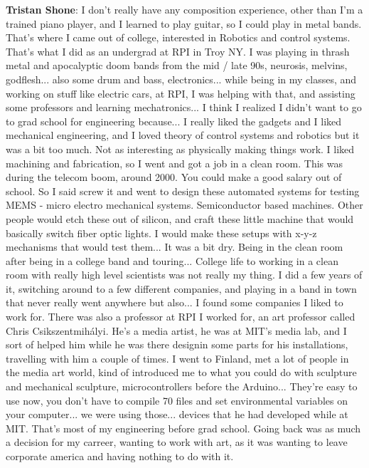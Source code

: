 \textbf{Tristan Shone}: I don't really have any composition experience, other than I'm a trained piano player, and I learned to play guitar, so I could play in metal bands. That's where I came out of college, interested in Robotics and control systems. That's what I did as an undergrad at RPI in Troy NY. I was playing in thrash metal and apocalyptic doom bands from the mid / late 90s, neurosis, melvins, godflesh... also some drum and bass, electronics... while being in my classes, and working on stuff like electric cars, at RPI, I was helping with that, and assisting some professors and learning mechatronics... I think I realized I didn't want to go to grad school for engineering because... I really liked the gadgets and I liked mechanical engineering, and I loved theory of control systems and robotics but it was a bit too much. Not as interesting as physically making things work. I liked machining and fabrication, so I went and got a job in a clean room. This was during the telecom boom, around 2000. You could make a good salary out of school. So I said screw it and went to design these automated systems for testing MEMS - micro electro mechanical systems. Semiconductor based machines. Other people would etch these out of silicon, and craft these little machine that would basically switch fiber optic lights. I would make these setups with x-y-z mechanisms that would test them... It was a bit dry. Being in the clean room after being in a college band and touring... College life to working in a clean room with really high level scientists was not really my thing. I did a few years of it, switching around to a few different companies, and playing in a band in town that never really went anywhere but also... I found some companies I liked to work for. There was also a professor at RPI I worked for, an art professor called Chris Csikszentmihályi. He's a media artist, he was at MIT's media lab, and I sort of helped him while he was there designin some parts for his installations, travelling with him a couple of times. I went to Finland, met a lot of people in the media art world, kind of introduced me to what you could do with sculpture and mechanical sculpture, microcontrollers before the Arduino... They're easy to use now, you don't have to compile 70 files and set environmental variables on your computer... we were using those... devices that he had developed while at MIT. That's most of my engineering before grad school. Going back was as much a decision for my carreer, wanting to work with art, as it was wanting to leave corporate america and having nothing to do with it. 

